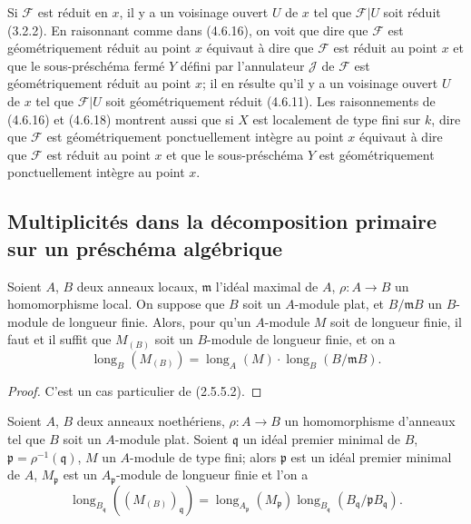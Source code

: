 
Si $\mathscr F$ est réduit en $x$, il y a un voisinage ouvert $U$ de $x$ tel
que $\mathscr F|U$ soit réduit (3.2.2). En raisonnant comme dans (4.6.16), on
voit que dire que $\mathscr F$ est géométriquement réduit au point $x$
équivaut à dire que $\mathscr F$ est réduit au point $x$ et que le
sous-préschéma fermé $Y$ défini par l'annulateur $\mathscr J$ de $\mathscr F$
est géométriquement réduit au point $x$; il en résulte qu'il y a un voisinage
ouvert $U$ de $x$ tel que $\mathscr F|U$ soit géométriquement réduit (4.6.11).
Les raisonnements de (4.6.16) et (4.6.18) montrent aussi que si $X$ est
localement de type fini sur $k$, dire que $\mathscr F$ est géométriquement
ponctuellement intègre au point $x$ équivaut à dire que $\mathscr F$ est
réduit au point $x$ et que le sous-préschéma $Y$ est géométriquement
ponctuellement intègre au point $x$.

\subsection{Multiplicités dans la décomposition primaire sur un préschéma
algébrique}
\label{subsection:IV.4.7-fr}

\begin{lemma}[4.7.1]
\label{IV.2.4.7.1-fr}
Soient $A$, $B$ deux anneaux locaux, $\mathfrak m$ l'idéal maximal de $A$,
$\rho:A\to B$ un homomorphisme local. On suppose que $B$ soit un $A$-module
plat, et $B/\mathfrak mB$ un $B$-module de longueur finie. Alors, pour qu'un
$A$-module $M$ soit de longueur finie, il faut et il suffit que $M_{(B)}$ soit
un $B$-module de longueur finie, et on a
\begin{equation}
\operatorname{long}_B(M_{(B)})
=\operatorname{long}_A(M)\cdot\operatorname{long}_B(B/\mathfrak mB).
\tag{4.7.1.1}
\label{IV.2.4.7.1.1-fr}
\end{equation}
\end{lemma}

\begin{proof}
C'est un cas particulier de (2.5.5.2).
\end{proof}


\begin{corollary}[4.7.2]
\label{IV.2.4.7.2-fr}
Soient $A$, $B$ deux anneaux noethériens, $\rho:A\to B$ un homomorphisme
d'anneaux tel que $B$ soit un $A$-module plat. Soient $\mathfrak q$ un idéal
premier minimal de $B$, $\mathfrak p=\rho^{-1}(\mathfrak q)$, $M$ un
$A$-module de type fini; alors $\mathfrak p$ est un idéal premier minimal de
$A$, $M_{\mathfrak p}$ est un $A_{\mathfrak p}$-module de longueur finie et
l'on a
\begin{equation}
\operatorname{long}_{B_{\mathfrak q}}((M_{(B)})_{\mathfrak q})
=\operatorname{long}_{A_{\mathfrak p}}(M_{\mathfrak p})
 \operatorname{long}_{B_{\mathfrak q}}
 (B_{\mathfrak q}/\mathfrak pB_{\mathfrak q}).
\tag{4.7.2.1}
\label{IV.2.4.7.2.1-fr}
\end{equation}
\end{corollary}

